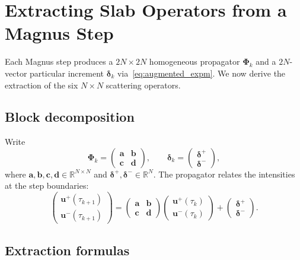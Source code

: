 \documentclass[11pt,a4paper]{article}
\newcommand{\R}{\mathbb{R}}
\newcommand{\vect}[1]{\bm{#1}}
\newcommand{\mat}[1]{\mathbf{#1}}
\theoremstyle{definition}
\begin{document}
\section{Extracting Slab Operators from a Magnus Step}
\label{sec:extraction}

Each Magnus step produces a $2N\!\times\!2N$ homogeneous propagator
$\mat{\Phi}_k$ and a $2N$-vector particular increment
$\vect{\delta}_k$ via~\eqref{eq:augmented_expm}.  We now derive the
extraction of the six $N\!\times\!N$ scattering operators.

\subsection{Block decomposition}

Write
\begin{equation}\label{eq:block_decomp}
  \mat{\Phi}_k = \begin{pmatrix}\mat{a}&\mat{b}\\\mat{c}&\mat{d}\end{pmatrix},
  \qquad
  \vect{\delta}_k = \begin{pmatrix}\vect{\delta}^+\\\vect{\delta}^-\end{pmatrix},
\end{equation}
where $\mat{a},\mat{b},\mat{c},\mat{d}\in\R^{N\times N}$ and
$\vect{\delta}^+,\vect{\delta}^-\in\R^N$.  The propagator relates
the intensities at the step boundaries:
\begin{equation}
  \begin{pmatrix}\vect{u}^+(\tau_{k+1})\\\vect{u}^-(\tau_{k+1})\end{pmatrix}
  = \begin{pmatrix}\mat{a}&\mat{b}\\\mat{c}&\mat{d}\end{pmatrix}
    \begin{pmatrix}\vect{u}^+(\tau_k)\\\vect{u}^-(\tau_k)\end{pmatrix}
  + \begin{pmatrix}\vect{\delta}^+\\\vect{\delta}^-\end{pmatrix}.
\end{equation}

\subsection{Extraction formulas}
\end{document}
